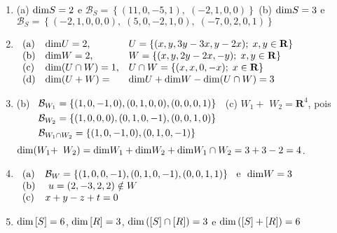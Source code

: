 \documentclass{report}
\renewcommand{\dim}{{\rm dim}}           %
\begin{document}
\begin{enumerate}
\item  (a) $\dim S=2$ e $\mathcal{B}_{S}=\left\{ \left( 11,0,-5,1\right)
,\;\left( -2,1,0,0\right) \right\} $\newline
(b) $\dim S=3$ e $\mathcal{B}_{S}=\left\{ \left( -2,1,0,0,0\right) ,\;\left(
5,0,-2,1,0\right) ,\;\left( -7,0,2,0,1\right) \right\} $

\item  $
\begin{array}[t]{lll}
\text{(a)} & \dim U=2\text{,} & U=\left\{ (x,y,3y-3x,y-2x);\;x,y\in \mathbf{R%
}\right\}  \\
\text{(b)} & \dim W=2\text{,} & W=\left\{ (x,y,2y-2x,-y);\;x,y\in \mathbf{R}%
\right\}  \\
\text{(c)} & \dim (U\cap W)=1\text{,} & U\cap W=\left\{ (x,x,0,-x);\;x\in
\mathbf{R}\right\}  \\
\text{(d)} & \dim (U+W)= & \dim U+\dim W-\dim (U\cap W)=3
\end{array}
$ \qquad  \qquad \qquad

\item  (b) $
\begin{array}[t]{l}
\mathcal{B}_{W_{1}}=\left\{ (1,0,-1,0),(0,1,0,0),(0,0,0,1)\right\}
\smallskip  \\
\mathcal{B}_{W_{2}}=\left\{ (1,0,0,0),(0,1,0,-1),(0,0,1,0)\right\}
\smallskip  \\
\mathcal{B}_{W_{1}\cap W_{2}}=\left\{ (1,0,-1,0),(0,1,0,-1)\right\}
\smallskip
\end{array}
$\newline
(c) $W_{1}+$ $W_{2}=\mathbf{R}^{4}$, pois $\dim (W_{1}+$ $W_{2})=\dim
W_{1}+\dim W_{2}+\dim W_{1}\cap W_{2}=3+3-2=4$.

\item  $
\begin{array}[t]{ll}
\text{(a)} & \mathcal{B}_{W}=\left\{ (1,0,0,-1),(0,1,0,-1),\left(
0,0,1,1\right) \right\} \text{\textit{\ \ }e}\mathit{\ \ }\dim W=3\newline
\\
\text{(b)} & \mathit{\ }u=\left( 2,-3,2,2\right) \notin W\newline
\\
\text{(c)} & x+y-z+t=0
\end{array}
$

\item  $\dim \left[ S\right] =6$, $\dim \left[ R\right] =3$, $\dim \left(
\left[ S\right] \cap \left[ R\right] \right) =3$ e $\dim \left( \left[
S\right] +\left[ R\right] \right) =6$


\end{enumerate}
\end{document}
